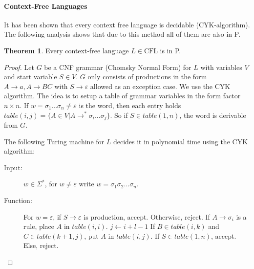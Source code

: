 \documentclass[10pt,fleqn]{article}
\theoremstyle{definition}
\newtheorem{theorem}{Theorem}
\theoremstyle{remark}
\newcommand{\cflclass}{\text{CFL}}
\begin{document}
\newpage

\paragraph*{Context-Free Languages} It has been shown that every context free language is decidable (CYK-algorithm). The following analysis shows that due to this method all of them are also in P.

\begin{theorem}
    Every context-free language \(L \in \cflclass\) is in P.
\end{theorem}

\begin{proof} Let \(G\) be a CNF grammar (Chomsky Normal Form) for \(L\) with variables \(V\) and start variable \(S \in V\). \(G\) only consists of productions in the form \(A \rightarrow a, A \rightarrow BC\) with \(S \rightarrow \varepsilon\) allowed as an exception case. We use the CYK algorithm. The idea is to setup a table of grammar variables in the form factor \(n \times n\). If \(w = \sigma_1...\sigma_n \neq \varepsilon\) is the word, then each entry holds \(table(i, j) = \{ A \in V | A \rightarrow^* \sigma_i...\sigma_j  \}\). So if \(S \in table(1, n)\), the word is derivable from \(G\).

The following Turing machine for \(L\) decides it in polynomial time using the CYK algorithm:

\begin{description}
    \item[Input:] \(w \in \Sigma^*\), for \(w \neq \varepsilon\) write \(w = \sigma_1\sigma_2...\sigma_n\).
    \item[Function:] \phantom{}
        \begin{algorithmic}[1]
            \State For \(w = \varepsilon\), if \(S \rightarrow \varepsilon\) is production, accept. Otherwise, reject.
                    \State If \(A \rightarrow \sigma_i\) is a rule, place \(A\) in \(table(i, i)\).
                \EndFor
            \EndFor
             
                 
                    \State \(j \gets i + l - 1\) 
                     
                            \State If \(B \in table(i, k)\) and \(C \in table(k + 1, j)\), put \(A\) in \(table(i, j)\).
                        \EndFor
                    \EndFor
                \EndFor
            \EndFor
            \State If \(S \in table(1, n)\), accept. Else, reject.
        \end{algorithmic}
\end{description}


\end{proof}
\end{document}
